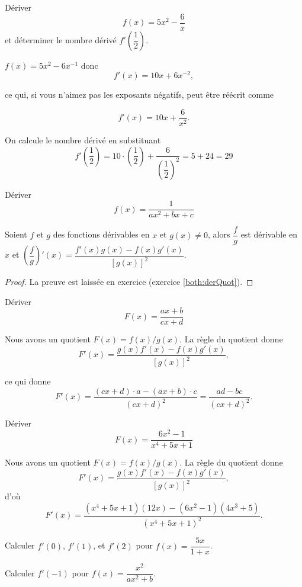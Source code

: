 \documentclass[a4paper,12pt]{article}
\begin{document}
\begin{exemple}
   \tcblower
  Dériver 
   $$f(x) = 5x^2 - \frac{6}{x}$$ et déterminer le nombre dérivé $f'\left(\dfrac{1}{2}\right)$.

   $f(x) = 5x^2 - 6x^{-1}$ donc
   $$f'(x) = 10x + 6x^{-2},$$
   
   ce qui, si vous n'aimez pas les exposants négatifs, peut être réécrit comme

   $$f'(x) = 10x + \frac{6}{x^2}.$$

   On calcule le nombre dérivé en substituant 
   \[f'\left(\dfrac{1}{2}\right)=10\cdot \left(\dfrac{1}{2}\right) + \dfrac{6}{\left(\dfrac{1}{2}\right)^2}=5+24=29\]
\end{exemple}

\begin{exemple}
	\tcblower
	Dériver 
	\[f(x)=\dfrac{1}{ax^2+bx+c}\]
	\vspace{6cm}
\end{exemple}
\begin{prop}[label=prop:derQuot]
   \tcblower
   Soient $f$ et $g$ des fonctions dérivables en $x$ et $g(x)\neq 0$, alors $\dfrac{f}{g}$ est dérivable en $x$ et $\left(\dfrac{f}{g}\right)'(x)=\dfrac{f'(x)g(x)-f(x)g'(x)}{[g(x)]^2}$. 
   \medskip

   \begin{proof}
	   La preuve est laissée en exercice (exercice \ref{both:derQuot}).
   \end{proof}
\end{prop}

\begin{exemple}
   \tcblower
  Dériver 
   $$F(x) = \frac{ax+b}{cx+d}$$
   
Nous avons un quotient $F(x) = f(x)/g(x)$. La règle du quotient donne
   $$F'(x) = \frac{g(x)f'(x) - f(x)g'(x)}{[g(x)]^2},$$
   
   ce qui donne
   $$F'(x) = \frac{(cx+d) \cdot a - (ax+b) \cdot c}{(cx+d)^2} = \frac{ad - bc}{(cx+d)^2}.$$
\end{exemple}
\begin{exemple}
	\tcblower
Dériver	
	$$F(x) = \frac{6x^2 - 1}{x^4 + 5x + 1}$$
	
Nous avons un quotient $F(x) = f(x)/g(x)$. La règle du quotient donne
	$$F'(x) = \frac{g(x)f'(x) - f(x)g'(x)}{[g(x)]^2},$$
	d'où
	$$F'(x) = \frac{(x^4 + 5x + 1)(12x) - (6x^2 - 1)(4x^3 + 5)}{(x^4 + 5x + 1)^2}.$$
\end{exemple}
\begin{exemple}
	\tcblower
	Calculer $f'(0)$, $f'(1)$, et $f'(2)$ pour $f(x) = \dfrac{5x}{1+x}$.
	
	\vspace{5cm}

\end{exemple}
\begin{exemple}
	\tcblower
	Calculer $f'(-1)$ pour $f(x) = \dfrac{x^2}{ax^2 + b}$.
	
	\vspace{5.5cm}
\end{exemple}
\end{document}
